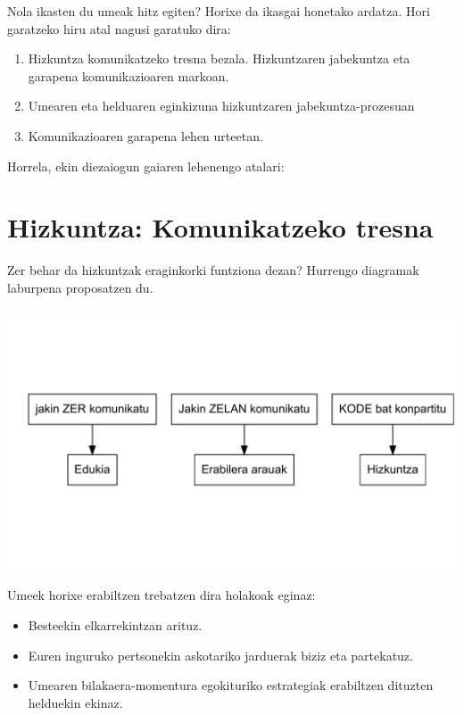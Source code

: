 \documentclass[
]{book}
\providecommand{\tightlist}{%
  \setlength{\itemsep}{0pt}\setlength{\parskip}{0pt}}
\begin{document}
Nola ikasten du umeak hitz egiten? Horixe da ikasgai honetako ardatza. Hori garatzeko hiru atal nagusi garatuko dira:

\begin{enumerate}
\def\labelenumi{\arabic{enumi}.}
\tightlist
\item
  Hizkuntza komunikatzeko tresna bezala. Hizkuntzaren jabekuntza eta garapena komunikazioaren markoan.
\item
  Umearen eta helduaren eginkizuna hizkuntzaren jabekuntza-prozesuan
\item
  Komunikazioaren garapena lehen urteetan.
\end{enumerate}

Horrela, ekin diezaiogun gaiaren lehenengo atalari:

\hypertarget{hizkuntza-komunikatzeko-tresna}{%
\section{Hizkuntza: Komunikatzeko tresna}\label{hizkuntza-komunikatzeko-tresna}}

Zer behar da hizkuntzak eraginkorki funtziona dezan? Hurrengo diagramak laburpena proposatzen du.

\includegraphics{Hizkuntzaren-Didaktikako-apunteak-V-0-HaurHezkuntza-2020_files/figure-latex/2.1-1.pdf}

Umeek horixe erabiltzen trebatzen dira holakoak eginaz:

\begin{itemize}
\tightlist
\item
  Besteekin elkarrekintzan arituz.
\item
  Euren inguruko pertsonekin askotariko jarduerak biziz eta partekatuz.
\item
  Umearen bilakaera-momentura egokituriko estrategiak erabiltzen dituzten helduekin ekinaz.
\end{itemize}
\end{document}
